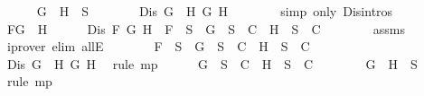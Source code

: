 \begin{isabellebody}
\ \ \ \ \isamarkupfalse%
\ {\isachardoublequoteopen}G\ \isactrlbold {\isasymor}\ H\ {\isasymin}\ S{\isachardoublequoteclose}\isanewline
\ \ \ \ \isamarkupfalse%
\ \isamarkupfalse%
\ {\isachardoublequoteopen}Dis\ {\isacharparenleft}G\ \isactrlbold {\isasymor}\ H{\isacharparenright}\ G\ H{\isachardoublequoteclose}\isanewline
\ \ \ \ \ \ \isamarkupfalse%
\ {\isacharparenleft}simp\ only{\isacharcolon}\ Dis{\isachardot}intros{\isacharparenleft}{}{\isacharparenright}{\isacharparenright}\isanewline
\ \ \ \ \isamarkupfalse%
\ {\isacharquery}F{\isacharequal}{\isachardoublequoteopen}G\ \isactrlbold {\isasymor}\ H{\isachardoublequoteclose}\isanewline
\ \ \ \ \isamarkupfalse%
\ {\isachardoublequoteopen}Dis\ {\isacharquery}F\ G\ H\ {\isasymlongrightarrow}\ {\isacharquery}F\ {\isasymin}\ S\ {\isasymlongrightarrow}\ {\isacharbraceleft}G{\isacharbraceright}\ {\isasymunion}\ S\ {\isasymin}\ C\ {\isasymor}\ {\isacharbraceleft}H{\isacharbraceright}\ {\isasymunion}\ S\ {\isasymin}\ C{\isachardoublequoteclose}\isanewline
\ \ \ \ \ \ \isamarkupfalse%
\ assms\ \isamarkupfalse%
\ {\isacharparenleft}iprover\ elim{\isacharcolon}\ allE{\isacharparenright}\isanewline
\ \ \ \ \isamarkupfalse%
\ \isamarkupfalse%
\ {\isachardoublequoteopen}{\isacharquery}F\ {\isasymin}\ S\ {\isasymlongrightarrow}\ {\isacharbraceleft}G{\isacharbraceright}\ {\isasymunion}\ S\ {\isasymin}\ C\ {\isasymor}\ {\isacharbraceleft}H{\isacharbraceright}\ {\isasymunion}\ S\ {\isasymin}\ C{\isachardoublequoteclose}\isanewline
\ \ \ \ \ \ \isamarkupfalse%
\ {\isacartoucheopen}Dis\ {\isacharparenleft}G\ \isactrlbold {\isasymor}\ H{\isacharparenright}\ G\ H{\isacartoucheclose}\ \isamarkupfalse%
\ {\isacharparenleft}rule\ mp{\isacharparenright}\isanewline
\ \ \ \ \isamarkupfalse%
\ {\isachardoublequoteopen}{\isacharbraceleft}G{\isacharbraceright}\ {\isasymunion}\ S\ {\isasymin}\ C\ {\isasymor}\ {\isacharbraceleft}H{\isacharbraceright}\ {\isasymunion}\ S\ {\isasymin}\ C{\isachardoublequoteclose}\isanewline
\ \ \ \ \ \ \isamarkupfalse%
\ {\isacartoucheopen}{\isacharparenleft}G\ \isactrlbold {\isasymor}\ H{\isacharparenright}\ {\isasymin}\ S{\isacartoucheclose}\ \isamarkupfalse%
\ {\isacharparenleft}rule\ mp{\isacharparenright}\isanewline
\ \ \isamarkupfalse%
\isanewline
{}\isamarkupfalse%
%
\endisatagproof
{\isafoldproof}%
%
\isadelimproof

\end{isabellebody}
